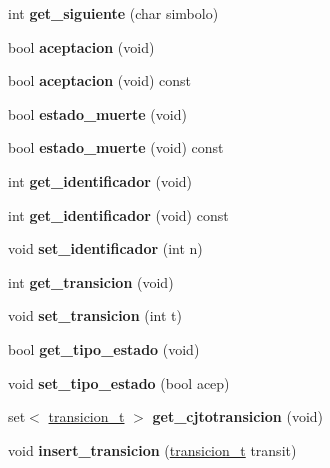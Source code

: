 \begin{DoxyCompactItemize}
\hypertarget{classestado__t_a76bd3f1ac5a8a56046dd67d700c5c972}{}\label{classestado__t_a76bd3f1ac5a8a56046dd67d700c5c972} 
int {\bfseries get\+\_\+siguiente} (char simbolo)
\item 
\hypertarget{classestado__t_aeef705b15d36479899a88c9b27af47c0}{}\label{classestado__t_aeef705b15d36479899a88c9b27af47c0} 
bool {\bfseries aceptacion} (void)
\item 
\hypertarget{classestado__t_a810a088f37d8166f74730a04c6c6e316}{}\label{classestado__t_a810a088f37d8166f74730a04c6c6e316} 
bool {\bfseries aceptacion} (void) const
\item 
\hypertarget{classestado__t_acf2473ca9312e96d1ae84d362de1386a}{}\label{classestado__t_acf2473ca9312e96d1ae84d362de1386a} 
bool {\bfseries estado\+\_\+muerte} (void)
\item 
\hypertarget{classestado__t_ae9f3dc4998871e68faf630bd5ec5c428}{}\label{classestado__t_ae9f3dc4998871e68faf630bd5ec5c428} 
bool {\bfseries estado\+\_\+muerte} (void) const
\item 
\hypertarget{classestado__t_aaa4aa08c95e22ad94027737ee1e11d16}{}\label{classestado__t_aaa4aa08c95e22ad94027737ee1e11d16} 
int {\bfseries get\+\_\+identificador} (void)
\item 
\hypertarget{classestado__t_a6d71202606bdc2240421d2e78bb4af9d}{}\label{classestado__t_a6d71202606bdc2240421d2e78bb4af9d} 
int {\bfseries get\+\_\+identificador} (void) const
\item 
\hypertarget{classestado__t_aa1ccbfaf7850dfef8e22d21eb7433703}{}\label{classestado__t_aa1ccbfaf7850dfef8e22d21eb7433703} 
void {\bfseries set\+\_\+identificador} (int n)
\item 
\hypertarget{classestado__t_acdd7a0bf4490b761bd910bd266e7fdb4}{}\label{classestado__t_acdd7a0bf4490b761bd910bd266e7fdb4} 
int {\bfseries get\+\_\+transicion} (void)
\item 
\hypertarget{classestado__t_aeaf584562d18dcb72ed4ac8a8c4b133f}{}\label{classestado__t_aeaf584562d18dcb72ed4ac8a8c4b133f} 
void {\bfseries set\+\_\+transicion} (int t)
\item 
\hypertarget{classestado__t_a95d36aa012efce14d9cce24abea8cdaf}{}\label{classestado__t_a95d36aa012efce14d9cce24abea8cdaf} 
bool {\bfseries get\+\_\+tipo\+\_\+estado} (void)
\item 
\hypertarget{classestado__t_a51435f3e0a8c11763d9ab027ea22226c}{}\label{classestado__t_a51435f3e0a8c11763d9ab027ea22226c} 
void {\bfseries set\+\_\+tipo\+\_\+estado} (bool acep)
\item 
\hypertarget{classestado__t_a54ee96d6f39c5518967056bdc342cbd2}{}\label{classestado__t_a54ee96d6f39c5518967056bdc342cbd2} 
set$<$ \hyperlink{classtransicion__t}{transicion\+\_\+t} $>$ {\bfseries get\+\_\+cjtotransicion} (void)
\item 
\hypertarget{classestado__t_ab3752ae66e55aabf04e4797651649719}{}\label{classestado__t_ab3752ae66e55aabf04e4797651649719} 
void {\bfseries insert\+\_\+transicion} (\hyperlink{classtransicion__t}{transicion\+\_\+t} transit)
\end{DoxyCompactItemize}

